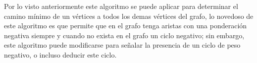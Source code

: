 Por lo visto anteriormente este algoritmo se puede aplicar para determinar el camino mínimo de un vértices a todos los demas vértices del grafo, lo novedoso de este algoritmo es que permite que en el grafo tenga aristas con una ponderación negativa siempre y cuando no exista en el grafo un ciclo negativo; sin embargo, este algoritmo puede modificarse para señalar la presencia de un ciclo de peso negativo, o incluso deducir este ciclo.